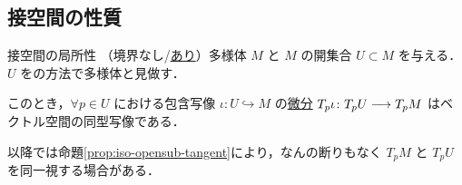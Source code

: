 \documentclass[geometry_main]{subfiles}
\begin{document}


\subsection{接空間の性質}

\begin{myprop}[label=prop:iso-opensub-tangent]{接空間の局所性}
	（境界なし/\hyperref[def:mani-with-boundary]{あり}）\cinfty 多様体 $M$ と $M$ の開集合 $U \subset M$ を与える．
	$U$ をの方法で\cinfty 多様体と見做す．

	このとき，$\forall p \in U$ における包含写像 $\iota \colon U \hookrightarrow M$ の\hyperref[def:functor-Tp]{微分} $T_p \iota \colon T_p U \longrightarrow T_p M$ はベクトル空間の同型写像である．
\end{myprop}

\begin{marker}
	以降では命題\ref{prop:iso-opensub-tangent}により，なんの断りもなく $T_p M$ と $T_p U$ を同一視する場合がある．
\end{marker}
\end{document}
